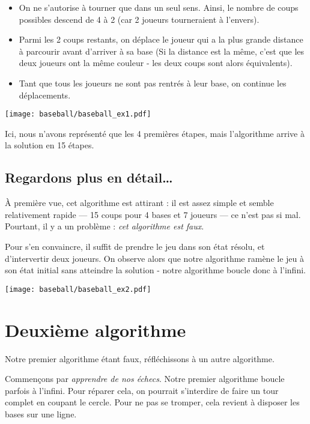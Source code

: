 \documentclass[a5paper,pagesize,DIV=14]{scrbook}
\begin{document}
\begin{itemize}
\item On ne s'autorise à tourner que dans un seul sens. Ainsi, le nombre de
  coups possibles descend de 4 à 2 (car 2 joueurs tourneraient à l'envers).
\item Parmi les 2 coups restants, on déplace le joueur qui a la plus grande
  distance à parcourir avant d'arriver à sa base (Si la distance est la même,
  c'est que les deux joueurs ont la même couleur - les deux coups sont alors
  équivalents).
\item Tant que tous les joueurs ne sont pas rentrés à leur base, on continue les
  déplacements.
\end{itemize}

\begin{center}
  \texttt{[image: baseball/baseball\_ex1.pdf]}
\end{center}

Ici, nous n'avons représenté que les 4 premières étapes, mais l'algorithme
arrive à la solution en 15 étapes.

\subsection*{Regardons plus en détail{\ldots}}

À première vue, cet algorithme est attirant : il est assez simple et semble
relativement rapide --- 15 coups pour 4 bases et 7 joueurs --- ce n'est pas si
mal. Pourtant, il y a un problème : \textit{cet algorithme est faux}.

Pour s'en convaincre, il suffit de prendre le jeu dans son état résolu, et
d'intervertir deux joueurs. On observe alors que notre algorithme ramène le jeu
à son état initial sans atteindre la solution - notre algorithme boucle donc à
l'infini.

\begin{center}
  \texttt{[image: baseball/baseball\_ex2.pdf]}
\end{center}

\newpage

\section*{Deuxième algorithme}

Notre premier algorithme étant faux, réfléchissons à un autre algorithme. 

Commençons par \textit{apprendre de nos échecs}. Notre premier algorithme boucle
parfois à l'infini. Pour réparer cela, on pourrait s'interdire de faire un tour
complet en coupant le cercle. Pour ne pas se tromper, cela revient à disposer
les bases sur une ligne.
\end{document}
